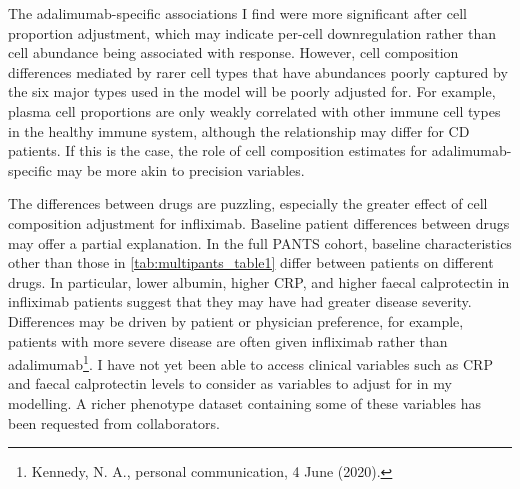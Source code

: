\begin{outline}
The adalimumab-specific associations I find were more significant after cell proportion adjustment, 
which may indicate per-cell downregulation rather than cell abundance being associated with response.
However, cell composition differences mediated by rarer cell types that have abundances poorly captured by the six major types used in the model will be poorly adjusted for.
For example, plasma cell proportions are only weakly correlated with other immune cell types in the healthy immune system\autocite{zalocusky201810000Immunomes}, 
although the relationship may differ for \gls{CD} patients.
If this is the case, the role of cell composition estimates for adalimumab-specific may be more akin to precision variables.

The differences between drugs are puzzling, especially the greater effect of cell composition adjustment for infliximab. 
Baseline patient differences between drugs may offer a partial explanation.
In the full \gls{PANTS} cohort, baseline characteristics other than those in \autoref{tab:multipants_table1} differ between patients on different drugs\autocite{kennedy2019PredictorsAntiTNFTreatment}.
In particular, lower albumin, higher \gls{CRP}, and higher faecal calprotectin in infliximab patients suggest that they may have had greater disease severity.
Differences may be driven by patient or physician preference, for example, patients with more severe disease are often given infliximab rather than adalimumab\footnote{Kennedy, N. A., personal communication, 4 June (2020).}.
I have not yet been able to access clinical variables such as \gls{CRP} and faecal calprotectin levels to consider as variables to adjust for in my modelling.
A richer phenotype dataset containing some of these variables has been requested from collaborators.


\end{outline}
